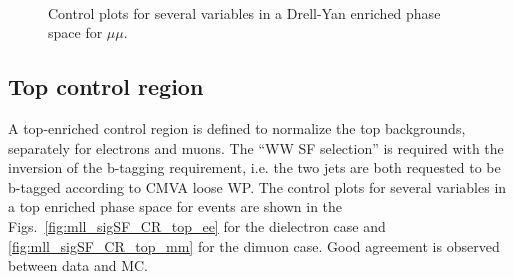 \begin{figure}[h]
\\

\caption{Control plots for several variables in a Drell-Yan enriched phase space for $\mu \mu$.}
    \label{fig:mll_sigSF_CR_DY_mm}
\end{figure}

\newpage
\clearpage
\subsection*{Top control region}
A top-enriched control region is defined to normalize the top backgrounds,
separately for electrons and muons.
The ``WW SF selection'' is required with the inversion of the b-tagging
requirement, i.e. the two jets are both requested to be b-tagged according to
CMVA loose WP.
The control plots for several variables in a top enriched phase space for events are shown in
the Figs.~\ref{fig:mll_sigSF_CR_top_ee} for the dielectron case and
\ref{fig:mll_sigSF_CR_top_mm} for the dimuon case. Good agreement is observed
between data and MC.



